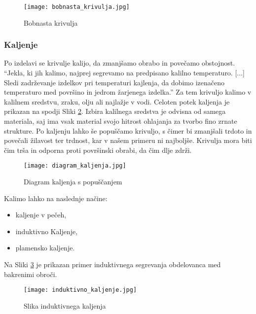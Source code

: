 \begin{figure}[H]
	\begin{center}
		\texttt{[image: bobnasta\_krivulja.jpg]}
		\caption{Bobnasta krivulja
			\cite{lasten}}
		\label{bobnaste_krivulje}
	\end{center}
\end{figure}

\subsubsection{Kaljenje}
Po izdelavi se krivulje kalijo, da zmanjšamo obrabo in povečamo
obstojnost. \enquote{Jekla, ki jih kalimo, najprej segrevamo na predpisano
	kalilno temperaturo. [...] Sledi zadrževanje izdelkov pri temperaturi
	kajlenja, da dobimo izenačeno temperaturo med površino in jedrom
	žarjenega izdelka.} \cite{gradiva}
Za tem krivuljo kalimo v kalilnem sredstvu, zraku, olju ali najlažje
v vodi. Celoten potek kaljenja je prikazan na spodji Sliki \ref{diagram_kaljenja}.
Izbira kalilnega sredstva je odvisna od samega materiala,
saj ima vsak material svojo hitrost ohlajanja za tvorbo fino zrnate strukture.
Po kaljenju lahko še popuščamo krivuljo, s čimer bi zmanjšali trdoto
in povečali žilavost ter trdnost, kar v našem primeru ni najboljše.
Krivulja mora biti čim trša in odporna proti površinski obrabi,
da čim dlje zdrži.

\begin{figure}[H]
	\begin{center}
		\texttt{[image: diagram\_kaljenja.jpg]}
		\caption{Diagram kaljenja s popuščanjem
			\cite{diagram_kaljenja}}
		\label{diagram_kaljenja}
	\end{center}
\end{figure}

Kalimo lahko na naslednje načine:
\begin{itemize}
	\item kaljenje v pečeh,
	\item induktivno Kaljenje,
	\item plamensko kaljenje.
\end{itemize}

Na Sliki \ref{induktivno_kaljenje} je prikazan primer induktivnega
segrevanja obdelovanca med bakrenimi obroči.

\begin{figure}[H]
	\begin{center}
		\texttt{[image: induktivno\_kaljenje.jpg]}
		\caption{Slika induktivnega kaljenja
			\cite{induktivno_kaljenje}}
		\label{induktivno_kaljenje}
	\end{center}
\end{figure}

